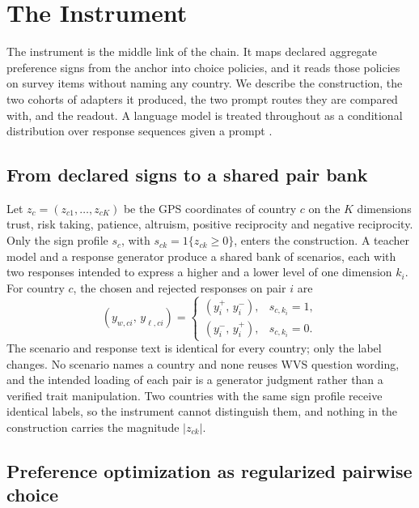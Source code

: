 \section{The Instrument}\label{sec:instrument}

The instrument is the middle link of the chain. It maps declared aggregate preference signs from the anchor into choice policies, and it reads those policies on survey items without naming any country. We describe the construction, the two cohorts of adapters it produced, the two prompt routes they are compared with, and the readout. A language model is treated throughout as a conditional distribution over response sequences given a prompt \citep{ludwig2026}.

\subsection{From declared signs to a shared pair bank}

Let $z_c=(z_{c1},\ldots,z_{cK})$ be the GPS coordinates of country $c$ on the $K$ dimensions trust, risk taking, patience, altruism, positive reciprocity and negative reciprocity. Only the sign profile $s_c$, with $s_{ck}=1\{z_{ck}\geq 0\}$, enters the construction. A teacher model and a response generator produce a shared bank of scenarios, each with two responses intended to express a higher and a lower level of one dimension $k_i$. For country $c$, the chosen and rejected responses on pair $i$ are
\begin{equation}
(y_{w,ci},\,y_{\ell,ci})=\begin{cases}(y_i^{+},\,y_i^{-}), & s_{c,k_i}=1,\\ (y_i^{-},\,y_i^{+}), & s_{c,k_i}=0.\end{cases}
\label{eq:sign_rule}
\end{equation}
The scenario and response text is identical for every country; only the label changes. No scenario names a country and none reuses WVS question wording, and the intended loading of each pair is a generator judgment rather than a verified trait manipulation. Two countries with the same sign profile receive identical labels, so the instrument cannot distinguish them, and nothing in the construction carries the magnitude $|z_{ck}|$.

\subsection{Preference optimization as regularized pairwise choice}

